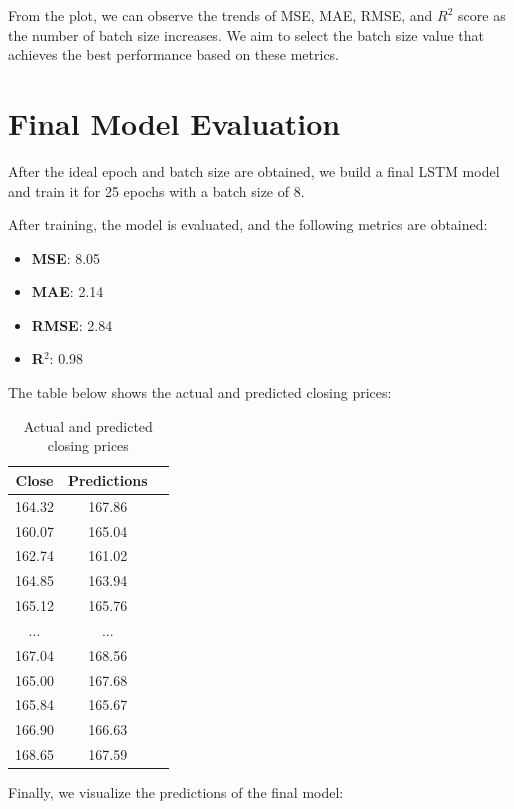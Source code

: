 \documentclass[10pt,twocolumn,letterpaper]{article}
\begin{document}
From the plot, we can observe the trends of MSE, MAE, RMSE, and $R^2$ score as the 
number of batch size increases. We aim to select the batch size value that achieves the 
best performance based on these metrics.

\section{Final Model Evaluation}

After the ideal epoch and batch size are obtained, we build a final LSTM model and train it
for 25 epochs with a batch size of 8.

After training, the model is evaluated, and the following metrics are obtained:

\begin{itemize}
    \item \textbf{MSE}: 8.05
    \item \textbf{MAE}: 2.14
    \item \textbf{RMSE}: 2.84
    \item \textbf{R$^2$}: 0.98
\end{itemize}

The table below shows the actual and predicted closing prices:

\begin{table}[H]
    \centering
    \begin{tabular}{ccc}
        \toprule
        \textbf{Close} & \textbf{Predictions} \\
        \midrule
        164.32 & 167.86 \\
        160.07 & 165.04 \\
        162.74 & 161.02 \\
        164.85 & 163.94 \\
        165.12 & 165.76 \\
        ... & ... \\
        167.04 & 168.56 \\
        165.00 & 167.68 \\
        165.84 & 165.67 \\
        166.90 & 166.63 \\
        168.65 & 167.59 \\
        \bottomrule
    \end{tabular}
    \caption{Actual and predicted closing prices}
    \label{tab:actual_predicted_prices}
\end{table}

Finally, we visualize the predictions of the final model:
\end{document}
